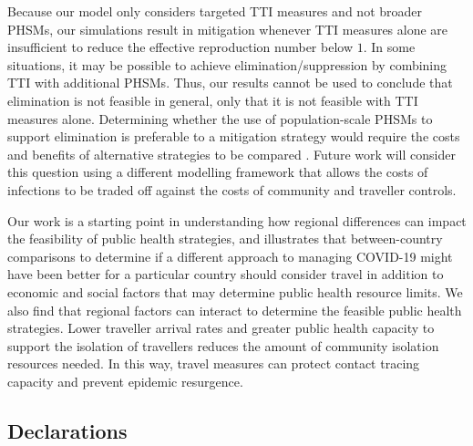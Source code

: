 \documentclass[pdflatex]{sn-jnl}
\theoremstyle{thmstyleone}%
\theoremstyle{thmstyletwo}%
\theoremstyle{thmstylethree}%
\begin{document}
Because our model only considers targeted TTI measures and not broader PHSMs, our simulations result in mitigation whenever TTI measures alone are insufficient to reduce the effective reproduction number below $1$. In some situations, it may be possible to achieve elimination/suppression by combining TTI with additional PHSMs. Thus, our results cannot be used to conclude that elimination is not feasible in general, only that it is not feasible with TTI measures alone. Determining whether the use of population-scale PHSMs to support elimination is preferable to a mitigation strategy would require the costs and benefits of alternative strategies to be compared \citep{plank2025joint}. Future work will consider this question using a different modelling framework that allows the costs of infections to be traded off against the costs of community and traveller controls.  

Our work is a starting point in understanding how regional differences can impact the feasibility of public health strategies, and illustrates that between-country comparisons to determine if a different approach to managing COVID-19 might have been better for a particular country should consider travel in addition to economic and social factors that may determine public health resource limits. We also find that regional factors can interact to determine the feasible public health strategies.  Lower traveller arrival rates and greater public health capacity to support the isolation of travellers reduces the amount of community isolation resources needed. In this way, travel measures can protect contact tracing capacity and prevent epidemic resurgence.


\backmatter



\subsection*{Declarations}
\end{document}
